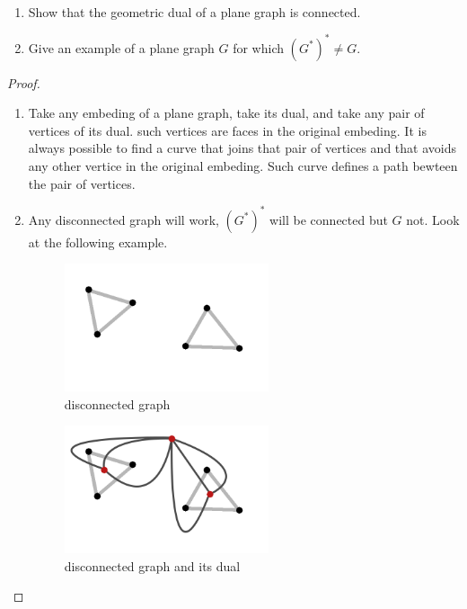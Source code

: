 \prob
{$\,$\pn
    \begin{enumerate}[label=(\roman*)]
        \item Show that the geometric dual of a plane graph is connected.
        \item Give an example of a plane graph $G$ for which $(G^*)^* \not= G$.
    \end{enumerate}
}
\begin{proof}$\,$\pn
    \begin{enumerate}[label=(\roman*)]
        \item Take any embeding of a plane graph, take its dual, and take any pair of vertices of its dual.
            such vertices are faces in the original embeding. It is always possible to find a curve that joins 
            that pair of vertices and that avoids any other vertice in the original embeding. Such curve defines
            a path bewteen the pair of vertices.
            
        \item Any disconnected graph will work, $(G^*)^*$ will be connected but $G$ not. Look at the following example.
            \begin{figure}[H]
                \begin{center}
                \includegraphics[width=6cm]{Test2/Problem8/TwoTriangles.png}
                \end{center}                            
                \caption{disconnected graph}
                \label{t2:p8_TwoTriangles.png}                        
            \end{figure}\pn
            
            \begin{figure}[H]
                \begin{center}
                \includegraphics[width=6cm]{Test2/Problem8/TwoTrianglesDual.png}
                \end{center}                            
                \caption{disconnected graph and its dual}
                \label{t2:p8_TwoTrianglesDual.png}                        
            \end{figure}\pn
            

\end{enumerate}
\end{proof}
